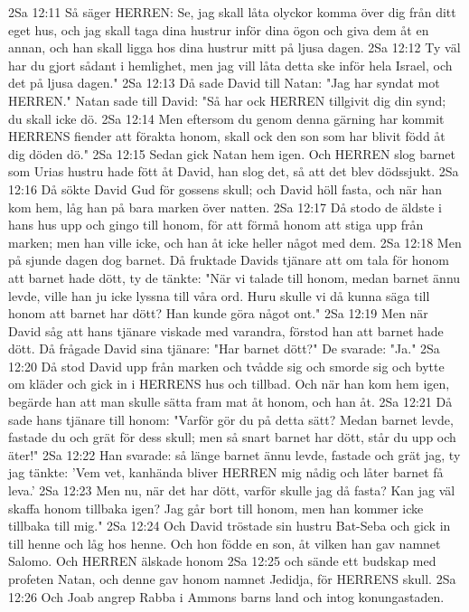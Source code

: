 2Sa 12:11  Så säger HERREN: Se, jag skall låta olyckor komma över dig från ditt eget hus, och jag skall taga dina hustrur inför dina ögon och giva dem åt en annan, och han skall ligga hos dina hustrur mitt på ljusa dagen.
2Sa 12:12  Ty väl har du gjort sådant i hemlighet, men jag vill låta detta ske inför hela Israel, och det på ljusa dagen."
2Sa 12:13  Då sade David till Natan: "Jag har syndat mot HERREN." Natan sade till David: "Så har ock HERREN tillgivit dig din synd; du skall icke dö.
2Sa 12:14  Men eftersom du genom denna gärning har kommit HERRENS fiender att förakta honom, skall ock den son som har blivit född åt dig döden dö."
2Sa 12:15  Sedan gick Natan hem igen. Och HERREN slog barnet som Urias hustru hade fött åt David, han slog det, så att det blev dödssjukt.
2Sa 12:16  Då sökte David Gud för gossens skull; och David höll fasta, och när han kom hem, låg han på bara marken över natten.
2Sa 12:17  Då stodo de äldste i hans hus upp och gingo till honom, för att förmå honom att stiga upp från marken; men han ville icke, och han åt icke heller något med dem.
2Sa 12:18  Men på sjunde dagen dog barnet. Då fruktade Davids tjänare att om tala för honom att barnet hade dött, ty de tänkte: "När vi talade till honom, medan barnet ännu levde, ville han ju icke lyssna till våra ord. Huru skulle vi då kunna säga till honom att barnet har dött? Han kunde göra något ont."
2Sa 12:19  Men när David såg att hans tjänare viskade med varandra, förstod han att barnet hade dött. Då frågade David sina tjänare: "Har barnet dött?" De svarade: "Ja."
2Sa 12:20  Då stod David upp från marken och tvådde sig och smorde sig och bytte om kläder och gick in i HERRENS hus och tillbad. Och när han kom hem igen, begärde han att man skulle sätta fram mat åt honom, och han åt.
2Sa 12:21  Då sade hans tjänare till honom: "Varför gör du på detta sätt? Medan barnet levde, fastade du och grät för dess skull; men så snart barnet har dött, står du upp och äter!"
2Sa 12:22  Han svarade: så länge barnet ännu levde, fastade och grät jag, ty jag tänkte: 'Vem vet, kanhända bliver HERREN mig nådig och låter barnet få leva.'
2Sa 12:23  Men nu, när det har dött, varför skulle jag då fasta? Kan jag väl skaffa honom tillbaka igen? Jag går bort till honom, men han kommer icke tillbaka till mig."
2Sa 12:24  Och David tröstade sin hustru Bat-Seba och gick in till henne och låg hos henne. Och hon födde en son, åt vilken han gav namnet Salomo. Och HERREN älskade honom
2Sa 12:25  och sände ett budskap med profeten Natan, och denne gav honom namnet Jedidja, för HERRENS skull.
2Sa 12:26  Och Joab angrep Rabba i Ammons barns land och intog konungastaden.
